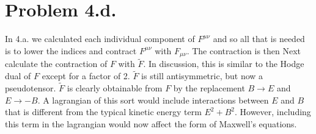 \documentclass{article}
\begin{document}
\section*{Problem 4.d.}
In 4.a. we calculated each individual component of $F^{\mu\nu}$ and so all that is needed is to lower the indices and contract $F^{\mu\nu}$ with $F_{\mu\nu}$.
The contraction is then
Next calculate the contraction of $F$ with $\tilde{F}$.
In discussion, this is similar to the Hodge dual of $F$ except for a factor of 2. $\tilde{F}$ is still antisymmetric, but now a pseudotensor. $\tilde{F}$ is clearly obtainable from $F$ by the replacement $B\rightarrow E$ and $E\rightarrow -B$. A lagrangian of this sort would include interactions between $E$ and $B$ that is different from the typical kinetic energy term $E^2+B^2$. However, including this term in the lagrangian would now affect the form of Maxwell's equations.
\end{document}
